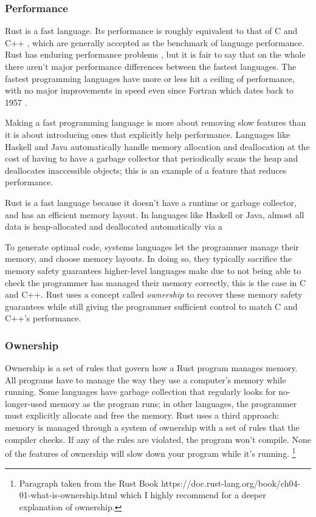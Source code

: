 \documentclass[12pt,twoside]{report}
\begin{document}
\subsubsection{Performance}
Rust is a fast language. Its performance is roughly equivalent to that of C and C++ \cite{RustVsWhich}, which are generally accepted as the benchmark of language performance. Rust has enduring performance problems \cite{AreWeStackefficient2022}, but it is fair to say that on the whole there aren't major performance differences between the fastest languages. The fastest programming languages have more or less hit a ceiling of performance, with no major improvements in speed even since Fortran \cite{GccVsClassic} which dates back to 1957 \cite[p. 16]{wilsonComparativeProgrammingLanguages2001}.

Making a fast programming language is more about removing slow features than it is about introducing ones that explicitly help performance. Languages like Haskell and Java automatically handle memory allocation and deallocation at the cost of having to have a garbage collector that periodically scans the heap and deallocates inaccessible objects; this is an example of a feature that reduces performance.

Rust is a fast language because it doesn't have a runtime or garbage collector, and has an efficient memory layout. In languages like Haskell or Java, almost all data is heap-allocated and deallocated automatically via a 

To generate optimal code, systems languages let the programmer manage their memory, and choose memory layouts. In doing so, they typically sacrifice the memory safety guarantees higher-level languages make due to not being able to check the programmer has managed their memory correctly, this is the case in C and C++. Rust uses a concept called \textit{ownership} to recover these memory safety guarantees while still giving the programmer sufficient control to match C and C++'s performance.

\subsubsection{Ownership}
Ownership is a set of rules that govern how a Rust program manages memory. All programs have to manage the way they use a computer’s memory while running. Some languages have garbage collection that regularly looks for no-longer-used memory as the program runs; in other languages, the programmer must explicitly allocate and free the memory. Rust uses a third approach: memory is managed through a system of ownership with a set of rules that the compiler checks. If any of the rules are violated, the program won’t compile. None of the features of ownership will slow down your program while it’s running. \footnote{Paragraph taken from the Rust Book https://doc.rust-lang.org/book/ch04-01-what-is-ownership.html which I highly recommend for a deeper explanation of ownership.}
\end{document}

